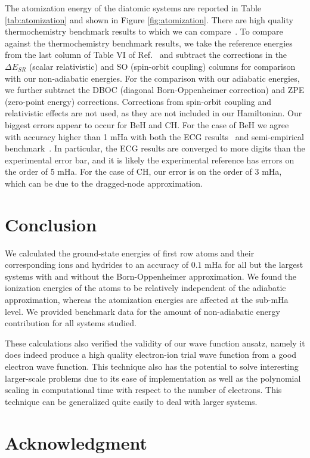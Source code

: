 \documentclass[pra,superscriptaddress,groupedaddress,twocolumn]{revtex4}
\begin{document}
The atomization energy of the diatomic systems are reported in Table \ref{tab:atomization} and shown in Figure \ref{fig:atomization}. There are high quality thermochemistry benchmark results to which we can compare~\cite{Feller_Corrections}. To compare against the thermochemistry benchmark results, we take the reference energies from the last column of Table VI of Ref.~\cite{Feller_Corrections} and subtract the corrections in the $\Delta E_{SR}$ (scalar relativistic) and SO (spin-orbit coupling) columns for comparison with our non-adiabatic energies. For the comparison with our adiabatic energies, we further subtract the DBOC (diagonal Born-Oppenheimer correction) and ZPE (zero-point energy) corrections. Corrections from spin-orbit coupling and relativistic effects are not used, as they are not included in our Hamiltonian. Our biggest errors appear to occur for BeH and CH. For the case of BeH we agree with accuracy higher than 1 mHa with both the ECG results~\cite{Bubin_BeH_noBO} and semi-empirical benchmark~\cite{Feller_Corrections,Davidson_Atoms}. In particular, the ECG results are converged to more digits than the experimental error bar, and it is likely the experimental reference has errors on the order of 5 mHa. For the case of CH, our error is on the order of 3 mHa, which can be due to the dragged-node approximation. 

\section{Conclusion}
We calculated the ground-state energies of first row atoms and their corresponding ions and hydrides to an accuracy of $0.1$ mHa for all but the largest systems with and without the Born-Oppenheimer approximation. We found the ionization energies of the atoms to be relatively independent of the adiabatic approximation, whereas the atomization energies are affected at the sub-mHa level. We provided benchmark data for the amount of non-adiabatic energy contribution for all systems studied. %

These calculations also verified the validity of our wave function ansatz, namely it does indeed produce a high quality electron-ion trial wave function from a good electron wave function. This technique also has the potential to solve interesting larger-scale problems due to its ease of implementation as well as the polynomial scaling in computational time with respect to the number of electrons.  This technique can be generalized quite easily to deal with larger systems.

\section{Acknowledgment}



\end{document}

